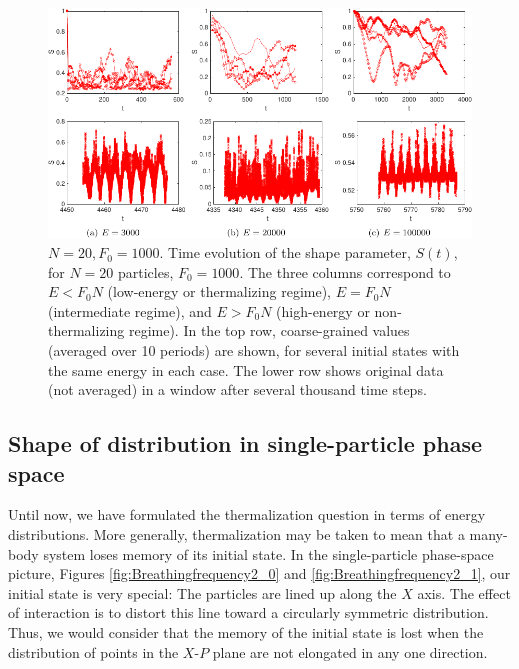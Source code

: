 \documentclass[a4paper, onecolumn]{revtex4-1}
\begin{document}
\begin{figure}[tb]
\includegraphics[width=\textwidth]{ZhiyuPictures/combine_shapedynamics_a_01-crop.pdf}
\caption{$N=20, F_0=1000$. Time evolution of the shape parameter, $S(t)$, for $N=20$ particles,
  $F_0=1000$.  The three columns correspond to $E<F_0N$ (low-energy or thermalizing regime),
  $E=F_0N$ (intermediate regime), and $E>F_0N$ (high-energy or non-thermalizing regime).  In the top
  row, coarse-grained values (averaged over 10 periods) are shown, for several initial states with
  the same energy in each case.  The lower row shows original data (not averaged) in a window after
  several thousand time steps.  }
\label{fig:time_evolution_of_S}
\end{figure}




\subsection{Shape of distribution in single-particle phase space}\label{section:Shape}

Until now, we have formulated the thermalization question in terms of energy distributions.  More
generally, thermalization may be taken to mean that a many-body system loses memory of its initial
state.  In the single-particle phase-space picture, Figures \ref{fig:Breathingfrequency2_0} and
\ref{fig:Breathingfrequency2_1}, our initial state is very special: The particles are lined up along
the $X$ axis.  The effect of interaction is to distort this line toward a circularly symmetric
distribution.  Thus, we would consider that the memory of the initial state is lost when the
distribution of points in the $X$-$P$ plane are not elongated in any one direction.
\end{document}
